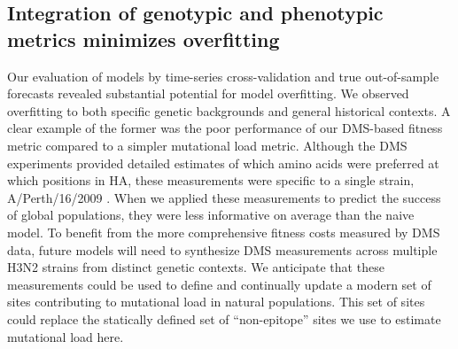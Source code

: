\subsection*{Integration of genotypic and phenotypic metrics minimizes overfitting}

Our evaluation of models by time-series cross-validation and true out-of-sample forecasts revealed substantial potential for model overfitting.
We observed overfitting to both specific genetic backgrounds and general historical contexts.
A clear example of the former was the poor performance of our DMS-based fitness metric compared to a simpler mutational load metric.
Although the DMS experiments provided detailed estimates of which amino acids were preferred at which positions in HA, these measurements were specific to a single strain, A/Perth/16/2009 \cite{Lee2018}.
When we applied these measurements to predict the success of global populations, they were less informative on average than the naive model.
To benefit from the more comprehensive fitness costs measured by DMS data, future models will need to synthesize DMS measurements across multiple H3N2 strains from distinct genetic contexts.
We anticipate that these measurements could be used to define and continually update a modern set of sites contributing to mutational load in natural populations.
This set of sites could replace the statically defined set of ``non-epitope'' sites we use to estimate mutational load here.

